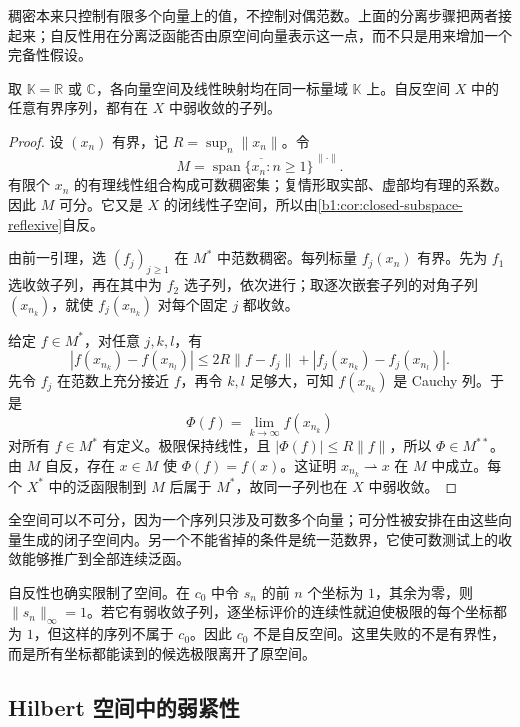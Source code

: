 \WeakStar{}稠密本来只控制有限多个向量上的值，不控制对偶范数。上面的分离步骤把两者接起来；自反性用在分离泛函能否由原空间向量表示这一点，而不只是用来增加一个完备性假设。

\begin{theorem}\label{b1:thm:reflexive-weak-subsequence}
取 \(\mathbb K=\mathbb R\) 或 \(\mathbb C\)，各向量空间及线性映射均在同一标量域 \(\mathbb K\) 上。自反空间 \(X\) 中的任意有界序列，都有在 \(X\) 中弱收敛的子列。
\end{theorem}
\begin{proof}
设 \((x_n)\) 有界，记 \(R=\sup_n\|x_n\|\)。令
\[
 M=\overline{\operatorname{span}\{x_n:n\ge1\}}^{\,\|\cdot\|}.
\]
有限个 \(x_n\) 的有理线性组合构成可数稠密集；复情形取实部、虚部均有理的系数。因此 \(M\) 可分。它又是 \(X\) 的闭线性子空间，所以由\cref{b1:cor:closed-subspace-reflexive}自反。

由前一引理，选 \((f_j)_{j\ge1}\) 在 \(M^*\) 中范数稠密。每列标量 \(f_j(x_n)\) 有界。先为 \(f_1\) 选收敛子列，再在其中为 \(f_2\) 选子列，依次进行；取逐次嵌套子列的对角子列 \((x_{n_k})\)，就使 \(f_j(x_{n_k})\) 对每个固定 \(j\) 都收敛。

给定 \(f\in M^*\)，对任意 \(j,k,l\)，有
\[
 |f(x_{n_k})-f(x_{n_l})|
 \le2R\|f-f_j\|
   +|f_j(x_{n_k})-f_j(x_{n_l})|.
\]
先令 \(f_j\) 在范数上充分接近 \(f\)，再令 \(k,l\) 足够大，可知 \(f(x_{n_k})\) 是 Cauchy 列。于是
\[
 \Phi(f)=\lim_{k\to\infty}f(x_{n_k})
\]
对所有 \(f\in M^*\) 有定义。极限保持线性，且 \(|\Phi(f)|\le R\|f\|\)，所以 \(\Phi\in M^{**}\)。由 \(M\) 自反，存在 \(x\in M\) 使 \(\Phi(f)=f(x)\)。这证明 \(x_{n_k}\rightharpoonup x\) 在 \(M\) 中成立。每个 \(X^*\) 中的泛函限制到 \(M\) 后属于 \(M^*\)，故同一子列也在 \(X\) 中弱收敛。
\end{proof}

全空间可以不可分，因为一个序列只涉及可数多个向量；可分性被安排在由这些向量生成的闭子空间内。另一个不能省掉的条件是统一范数界，它使可数测试上的收敛能够推广到全部连续泛函。

\ProseParagraphBreak

自反性也确实限制了空间。在 \(c_0\) 中令 \(s_n\) 的前 \(n\) 个坐标为 \(1\)，其余为零，则 \(\|s_n\|_\infty=1\)。若它有弱收敛子列，逐坐标评价的连续性就迫使极限的每个坐标都为 \(1\)，但这样的序列不属于 \(c_0\)。因此 \(c_0\) 不是自反空间。这里失败的不是有界性，而是所有坐标都能读到的候选极限离开了原空间。

\subsection{Hilbert 空间中的弱紧性}
\label{b1:subsec:090403}


